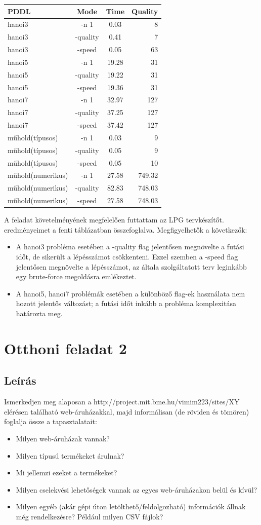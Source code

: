 \begin{tabular}{ l | c | c | r }
	PDDL &  Mode &  Time & Quality \\ \hline
	hanoi3 &  -n 1 &  0.03 &  8 \\
	hanoi3 &   -quality &  0.41  &  7 \\
	hanoi3 &   -speed &  0.05 &  63 \\
	hanoi5 &  -n 1 & 19.28  & 31 \\
	hanoi5 &   -quality & 19.22  & 31 \\
	hanoi5 &   -speed &  19.36 &  31\\
	hanoi7 &  -n 1 & 32.97   & 127 \\
	hanoi7 &   -quality &  37.25 &  127\\
	hanoi7 &   -speed & 37.42  & 127 \\
	műhold(típusos) &  -n 1 & 0.03 & 9 \\
	műhold(típusos) & -quality & 0.05 & 9 \\
	műhold(típusos) & -speed & 0.05 & 10\\
	műhold(numerikus) &  -n 1 & 27.58 & 749.32 \\
	műhold(numerikus) & -quality & 82.83 & 748.03 \\
	műhold(numerikus) & -speed & 27.58 & 748.03\\
\end{tabular}
A feladat követelményének megfelelően futtattam az LPG tervkészítőt. eredményeimet a fenti táblázatban összefoglalva. Megfigyelhetők a következők:
\begin{itemize}
\item A hanoi3 probléma esetében a -quality flag jelentősen megnövelte a futási időt, de sikerült a lépésszámot csökkenteni. Ezzel szemben a -speed flag jelentősen megnövelte a lépésszámot, az általa szolgáltatott terv leginkább egy brute-force megoldásra emlékeztet.
\item  A hanoi5, hanoi7 problémák esetében a különböző flag-ek használata nem hozott jelentős változást; a futási időt inkább a probléma komplexitása határozta meg.
\end{itemize}

\section{Otthoni feladat 2}
\subsection{Leírás}
Ismerkedjen meg alaposan a http://project.mit.bme.hu/vimim223/sites/XY elérésen található web-áruházakkal, majd informálisan (de röviden és tömören) foglalja össze a tapasztalatait:
\begin{itemize}
\item Milyen web-áruházak vannak? 
\item Milyen típusú termékeket árulnak? 
\item Mi jellemzi ezeket a termékeket? 
\item Milyen cselekvési lehetőségek vannak az egyes web-áruházakon belül és kívül? 
\item Milyen egyéb (akár gépi úton letölthető/feldolgozható) információk állnak még rendelkezésre? Például milyen CSV fájlok? 
\end{itemize}
